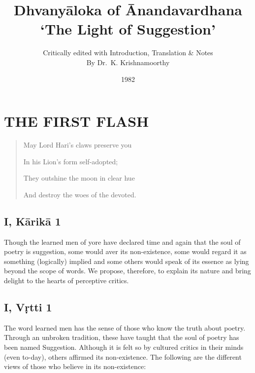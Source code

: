 \documentclass[12pt]{book}
\title{Dhvanyāloka of Ānandavardhana \\ `The Light of Suggestion'}
\author{Critically edited with Introduction, Translation \& Notes \\ By Dr.\ K. Krishnamoorthy}
\date{1982}
\begin{document}
\maketitle


\chapter{THE FIRST FLASH}


\begin{quotation}
\begin{em}
May Lord Hari's claws preserve you

In his Lion's form self-adopted;

They outshine the moon in clear hue

And destroy the woes of the devoted.
\end{em}
\end{quotation}



\section{I, Kārikā 1}

Though the learned men of yore have declared time and
again that the soul of poetry is suggestion, some would aver its
non-existence, some would regard it as something (logically)
implied and some others would speak of its essence as lying
beyond the scope of words. We propose, therefore, to explain
its nature and bring delight to the hearts of perceptive critics.


\section{I, Vṛtti 1}

The word learned men has the sense of those who know
the truth about poetry. Through an unbroken tradition, these
have taught that the soul of poetry has been named Suggestion.
Although it is felt so by cultured critics in their minds (even
to-day), others affirmed its non-existence. The following are
the different views of those who believe in its non-existence:
\end{document}
